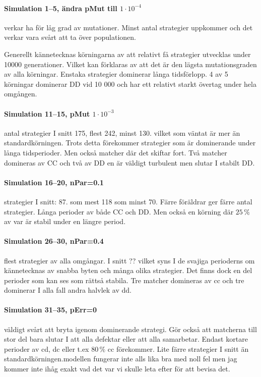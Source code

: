 \paragraph{Simulation 1--5, ändra pMut till $1\cdot 10^{-4}$}
verkar ha för låg grad av mutationer. Minst antal strategier uppkommer och det verkar vara svårt att ta över populationen.\mypar

Generellt kännetecknas körningarna av att relativt få strategier utvecklas under 10000 generationer.
Vilket kan förklaras av att det är den lägsta mutationsgraden av alla körningar. Enstaka strategier
dominerar långa tidsförlopp. 4 av 5 körningar dominerar DD vid 10 000 och har ett relativt starkt
övertag under hela omgången.\mypar


\paragraph{Simulation 11--15, pMut $1\cdot 10^{-3}$}
antal strategier I snitt 175, flest 242, minst 130. vilket som väntat är mer än standardkörningen. Trots
detta förekommer strategier som är dominerande under långa tidsperioder. Men också matcher där det
skiftar fort. Två matcher domineras av CC och två av DD en är väldigt turbulent men slutar I stabilt
DD.

\paragraph{Simulation 16--20, nPar=0.1}
strategier I snitt: 87. som mest 118 som minst 70. Färre föräldrar ger färre antal strategier. Långa
perioder av både CC och DD. Men också en körning där $25\,\%$ av var är stabil under en längre period.

\paragraph{Simulation 26--30, nPar=0.4}
flest strategier av alla omgångar. I snitt ?? vilket syns I de svajiga perioderns om kännetecknas av
snabba byten och många olika strategier. Det finns dock en del perioder som kan ses som rättså
stabila. Tre matcher domineras av cc och tre dominerar I alla fall andra halvlek av dd.

\paragraph{Simulation 31--35, pErr=0}
väldigt svårt att bryta igenom dominerande strategi. Gör också att matcherna till stor del bara slutar I
att alla defektar eller att alla samarbetar. Endast kortare perioder av cd, dc eller t.ex $80\,\%$ cc
förekommer. Lite färre strategier I snitt än standardkörningen.modellen fungerar inte alls lika bra med
noll fel men jag kommer inte ihåg exakt vad det var vi skulle leta efter för att bevisa det.


